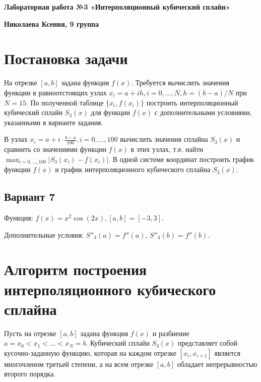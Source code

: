 \documentclass[12pt]{article}
\begin{document}
\begin{titlepage}
    \begin{center}
        \vspace*{\fill}
        
        \textbf{\LARGE Лабораторная работа №3
«Интерполяционный кубический сплайн»}
        
        \vspace{0.5cm}
        
        \textbf{\Large  Николаева Ксения, 9 группа}
        
        
        \vfill
        
    \end{center}
\end{titlepage}

\tableofcontents
\newpage

\section{Постановка задачи}

На отрезке $[a, b]$ задана функция $f(x)$. Требуется вычислить значения функции в равноотстоящих узлах
$x_i = a + ih, i = 0, \ldots, N, h = (b-a)/N$ при $N = 15$. По полученной таблице $\{x_i, f(x_i)\}$ построить интерполяционный кубический сплайн $S_3(x)$ для функции $f(x)$ с дополнительными условиями, указанными в варианте задания.

В узлах $x_i = a + i \cdot \frac{b-a}{100}, i = 0, \ldots, 100$ вычислить значения сплайна $S_3(x)$ и сравнить со значениями функции $f(x)$ в этих узлах, т.е. найти $\max_{i=0,\ldots,100} |S_3(x_i) - f(x_i)|$. В одной системе координат построить график функции $f(x)$ и график интерполяционного кубического сплайна $S_3(x)$.

\subsection{Вариант 7}
Функция: $f(x) = x^2 \cos(2x), [a, b] = [-3, 3]$.

Дополнительные условия: $S''_3(a) = f''(a)$, $S''_3(b) = f''(b)$.

\section{Алгоритм построения интерполяционного кубического сплайна}

Пусть на отрезке $[a, b]$ задана функция $f(x)$ и разбиение $a = x_0 < x_1 < \ldots < x_N = b$. Кубический сплайн $S_3(x)$ представляет собой кусочно-заданную функцию, которая на каждом отрезке $[x_i, x_{i+1}]$ является многочленом третьей степени, а на всем отрезке $[a, b]$ обладает непрерывностью второго порядка.
\end{document}

